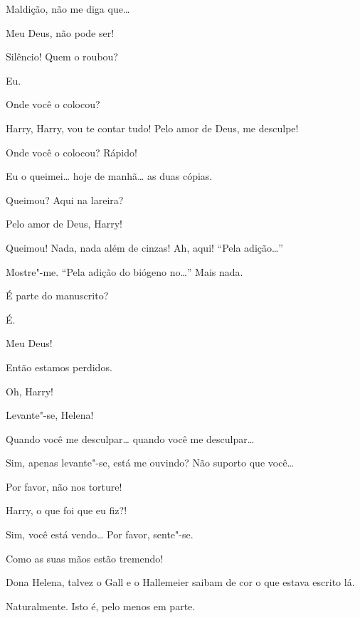  Maldição, não me diga que\ldots{}

 Meu Deus, não pode ser!

 Silêncio! Quem o roubou?

  Eu.

 Onde você o colocou?

 Harry, Harry, vou te contar tudo! Pelo amor de Deus, me desculpe!

 Onde você o colocou? Rápido!

 Eu o queimei\ldots{} hoje de manhã\ldots{} as duas cópias.

 Queimou? Aqui na lareira?

 Pelo amor de Deus, Harry!

  Queimou!  Nada, nada além de cinzas! Ah, aqui!  ``Pela adição\ldots{}''

 Mostre"-me.  ``Pela adição do biógeno no\ldots{}'' Mais nada.

  É parte do manuscrito?

 É.

 Meu Deus!

 Então estamos perdidos.

 Oh, Harry!

 Levante"-se, Helena!

 Quando você me desculpar\ldots{} quando você me desculpar\ldots{}

 Sim, apenas levante"-se, está me ouvindo? Não suporto que você\ldots{}

  Por favor, não nos torture!

  Harry, o que foi que eu fiz?!

 Sim, você está vendo\ldots{} Por favor, sente"-se.

 Como as suas mãos estão tremendo!

 Dona Helena, talvez o Gall e o Hallemeier saibam de cor o
que estava escrito lá.

 Naturalmente. Isto é, pelo menos em parte.

